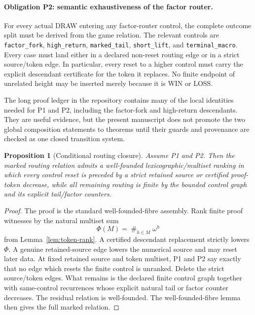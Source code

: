 \documentclass[11pt]{article}
\newtheorem{proposition}[theorem]{Proposition}
\begin{document}
\paragraph{Obligation P2: semantic exhaustiveness of the factor router.}
For every actual DRAW entering any factor-router control, the complete
outcome split must be derived from the game relation.  The relevant controls
are \texttt{factor\_fork}, \texttt{high\_return},
\texttt{marked\_tail}, \texttt{short\_lift}, and
\texttt{terminal\_macro}.  Every case must land either in a declared
non-reset routing edge or in a strict source/token edge.  In particular, every reset to a higher control
must carry the explicit descendant certificate for the token it replaces.
No finite endpoint of unrelated height may be inserted merely because it is
WIN or LOSS.

The long proof ledger in the repository contains many of the local identities
needed for P1 and P2, including the factor-fork and high-return descendants.
They are useful evidence, but the present manuscript does not promote the two
global composition statements to theorems until their guards and provenance
are checked as one closed transition system.

\begin{proposition}[Conditional routing closure]\label{prop:conditional-routing}
Assume P1 and P2.  Then the marked routing relation admits a well-founded
lexicographic/multiset ranking in which every control reset is preceded by a
strict retained source or certified proof-token decrease, while all remaining
routing is finite by the bounded control graph and its explicit tail/factor
counters.
\end{proposition}

\begin{proof}
The proof is the standard well-founded-fibre assembly.  Rank finite proof
witnesses by the natural multiset sum
\[
 \Phi(M)=\mathop{\#}_{h\in M}\omega^h
\]
from Lemma~\ref{lem:token-rank}.  A certified descendant replacement strictly
lowers $\Phi$.  A genuine retained-source edge lowers the numerical source and
may reset later data.  At fixed retained source and token multiset, P1 and P2
say exactly that no edge which resets the finite control is unranked.  Delete
the strict source/token edges.  What remains is the declared finite control
graph together with same-control recurrences whose explicit natural tail or
factor counter decreases.  The residual relation is well-founded.  The
well-founded-fibre lemma then gives the full marked relation.
\end{proof}
\end{document}
